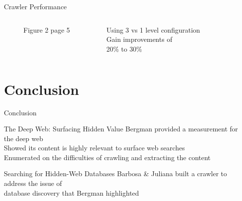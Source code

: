 \documentclass{beamer}
\begin{document}
\begin{frame}[fragile]{Crawler Performance}
\begin{columns}[T,onlytextwidth]
\begin{figure}
		\caption{Figure 2 page 5}
		\end{figure}
       \ \  Using 3 vs 1 level configuration \\ \ \ Gain improvements of \\ \ \ 20\% to 30\% \\
  \end{columns}
\end{frame}
\section{Conclusion}
\begin{frame}[fragile]{Conclusion}
\begin{block}{The Deep Web: Surfacing Hidden Value}
Bergman provided a measurement for the deep web \\
Showed its content is highly relevant to surface web searches \\
Enumerated on the difficulties of crawling and extracting the content
\end{block}
\begin{block}{Searching for Hidden-Web Databases}
Barbosa \& Juliana built a crawler to address the issue of  \\
database discovery that Bergman highlighted \\

\end{block}
\end{frame}
\end{document}
